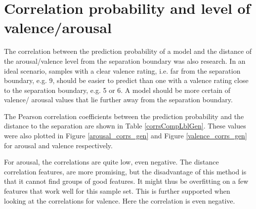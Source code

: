 
\section{Correlation probability and level of valence/arousal}

The correlation between the prediction probability of a model and the distance of the arousal/valence level from the separation boundary was also research. In an ideal scenario, samples with a clear valence rating, i.e. far from the separation boundary, e.g. 9, should be easier to predict than one with a valence rating close to the separation boundary, e.g. 5 or 6. A model should be more certain of valence/ arousal values that lie further away from the separation boundary.

\npar

The Pearson correlation coefficients between the prediction probability and the distance to the separation are shown in Table \ref{corrsCompLblGen}. These values were also plotted in Figure \ref{arousal_corrs_gen} and Figure \ref{valence_corrs_gen} for arousal and valence respectively.

\npar

For arousal, the correlations are quite low, even negative. The distance correlation features, are more promising, but the disadvantage of this method is that it cannot find groups of good features. It might thus be overfitting on a few features that work well for this sample set. This is further supported when looking at the correlations for valence. Here the correlation is even negative.

